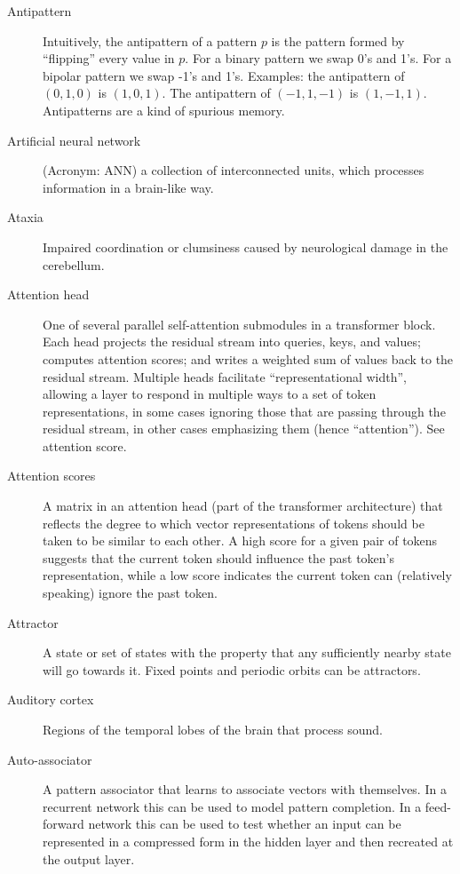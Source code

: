 \begin{description}
\item[Antipattern] Intuitively, the antipattern of a pattern $p$ is the pattern formed by ``flipping'' every value in $p$.  For a binary pattern we swap 0's and 1's. For a bipolar pattern we swap -1's and 1's. Examples: the antipattern of $(0,1,0)$ is  $(1,0,1)$. The antipattern of $(-1,1,-1)$ is  $(1,-1,1)$. Antipatterns are a kind of spurious memory.

\item[Artificial neural network] (Acronym: ANN) a collection of interconnected units, which processes information in a brain-like way.

\item[Ataxia] Impaired coordination or clumsiness caused by neurological damage in the cerebellum.

\item[Attention head] One of several parallel self-attention submodules in a transformer block. Each head  projects the residual stream into queries, keys, and values; computes attention scores; and writes a weighted sum of values back to the residual stream. Multiple heads facilitate ``representational width'', allowing a layer to respond in multiple ways to a set of token representations, in some cases ignoring those that are passing through the residual stream, in other cases emphasizing them (hence ``attention'').  See attention score.

\item[Attention scores] A matrix in an attention head (part of the transformer architecture) that reflects the degree to which vector representations of tokens should be taken to be similar to each other. A high score for a given pair of tokens suggests that the current token should influence the past token’s representation, while a low score indicates the current token can (relatively speaking) ignore the past token.

\item[Attractor] A state or set of states with the property that any  sufficiently nearby state will go towards it. Fixed points and periodic orbits can be attractors.

\item[Auditory cortex] Regions of the temporal lobes of the brain that process sound.

\item[Auto-associator] A pattern associator that learns to associate vectors with themselves. In a recurrent network this can be used to model pattern completion. In a feed-forward network this can be used to test whether an input can be represented in a compressed form in the hidden layer and then recreated at the output layer.


\end{description}
